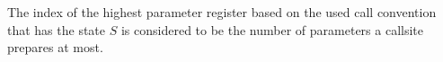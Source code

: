 %
%
%

The index of the highest parameter register based on the used call convention that has the state $S$ is considered to be the number of parameters a callsite prepares at most.

